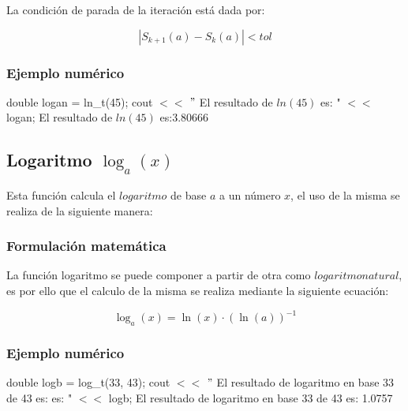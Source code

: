 \documentclass[10pt,a4paper]{article}
\begin{document}
	La condición de parada de la iteración está dada por: 
	
	\begin{equation}\label{key12}
		\left\lvert S_{k+1}(a) - S_{k}(a) \right\lvert < tol
	\end{equation}
	
	\subsubsection{Ejemplo numérico}

	double logan = ln{\_}t(45); \newline
	cout $<<$ $"$ El resultado de $ln(45)$ es: " $<<$ logan; \newline
	El resultado de $ln(45)$ es:3.80666\newline
	
	\subsection{Logaritmo $\log_{a}(x)$}
	
	Esta función calcula el $logaritmo$ de base $a$ a un número $x$, el uso de la misma se realiza de la siguiente manera:
	
	\begin{center}
	\end{center}
	
	\subsubsection{Formulación matemática}
	
	La función logaritmo se puede componer a partir de otra como $logaritmo natural$, es por ello que el calculo de la misma se realiza mediante la siguiente ecuación:
	
	\begin{equation}\label{key13}
		\log_{a}(x) = \ln(x)\cdot (\ln(a))^{-1}
	\end{equation}
	
	\subsubsection{Ejemplo numérico}

	double logb = log{\_}t(33, 43); \newline
	cout $<<$ $"$ El resultado de logaritmo en base 33 de 43 es: es: " $<<$ logb;
	El resultado de  logaritmo en base 33 de 43 es: 1.0757\newline
	
\end{document}
